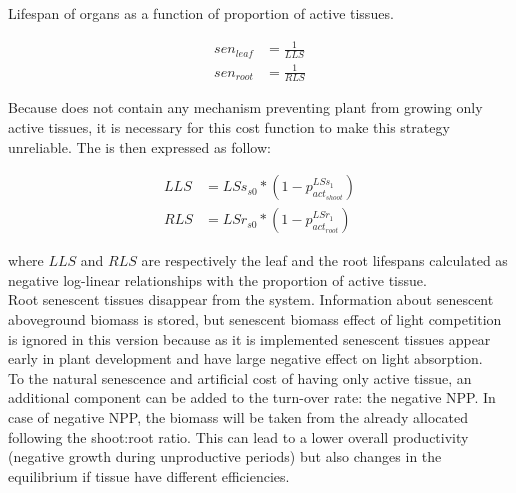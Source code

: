 \begin{marginfigure}
\label{fig:lifespan}
\caption{Lifespan of organs as a function of proportion of active tissues.}
\end{marginfigure}

\begin{align}
sen_{leaf} &= \frac{1}{LLS}\\
sen_{root} &= \frac{1}{RLS}
\end{align}

Because \model does not contain any mechanism preventing plant from growing only  active tissues, it is necessary for this cost function to make this strategy unreliable. The is then expressed as follow:

\begin{align}
LLS &= LSs_{s0} * (1- p_{act_{shoot}}^{LSs_{1}}) \\
RLS &= LSr_{s0} * (1- p_{act_{root}}^{LSr_{1}})
\end{align}


where $LLS$ and $RLS$ are respectively the leaf and the root lifespans calculated as negative log-linear relationships with the proportion of active tissue.\\
\indent Root senescent tissues disappear from the system. Information about senescent aboveground biomass is stored, but senescent biomass effect of light competition is ignored in this version because as it is implemented senescent tissues appear early in plant development and have large negative effect on light absorption.\\
\indent To the natural senescence and artificial cost of having only active tissue, an additional component can be added to the turn-over rate: the negative NPP. In case of negative NPP, the biomass will be taken from the already allocated following the shoot:root ratio. This can lead to a lower overall productivity (negative growth during unproductive periods) but also changes in the equilibrium if tissue have different efficiencies.\\

